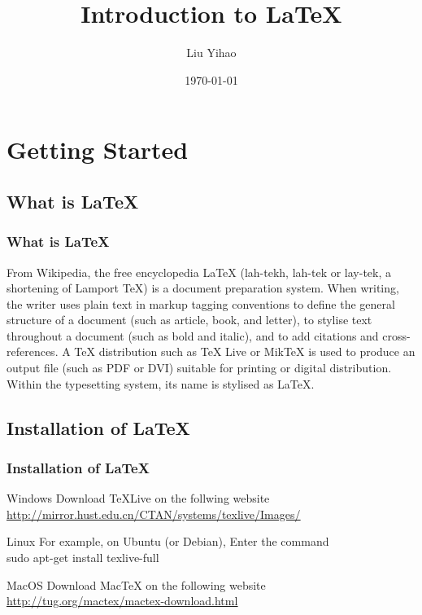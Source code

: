 \documentclass{beamer}
\title{Introduction to \LaTeX}
\author{Liu Yihao}
\date{\today}
\begin{document}
\begin{frame}
	\titlepage	
\end{frame}

\section{Getting Started}
\begin{frame}
\end{frame}

\subsection{What is \LaTeX}

\begin{frame}
	\frametitle{What is \LaTeX}
	\begin{block}{From Wikipedia, the free encyclopedia}
		LaTeX (lah-tekh, lah-tek or lay-tek, a shortening of Lamport TeX) is a document preparation system. When writing, the writer uses plain text in markup tagging conventions to define the general structure of a document (such as article, book, and letter), to stylise text throughout a document (such as bold and italic), and to add citations and cross-references. A TeX distribution such as TeX Live or MikTeX is used to produce an output file (such as PDF or DVI) suitable for printing or digital distribution. Within the typesetting system, its name is stylised as \LaTeX.
	\end{block}
\end{frame}

\subsection{Installation of \LaTeX}
\begin{frame}
	\frametitle{Installation of \LaTeX}
	\begin{block}{Windows}
		Download TeXLive on the follwing website\\
		\href{http://mirror.hust.edu.cn/CTAN/systems/texlive/Images/}{\color{blue}\underline{http://mirror.hust.edu.cn/CTAN/systems/texlive/Images/}}
	\end{block}
	\begin{block}{Linux}
		For example, on Ubuntu (or Debian), Enter the command\\
		\alert{sudo apt-get install texlive-full}
	\end{block}
	\begin{block}{MacOS}
		Download MacTeX on the following website\\
		\href{http://tug.org/mactex/mactex-download.html}
		{\color{blue}\underline{http://tug.org/mactex/mactex-download.html}}
	\end{block}
\end{frame}
\end{document}
